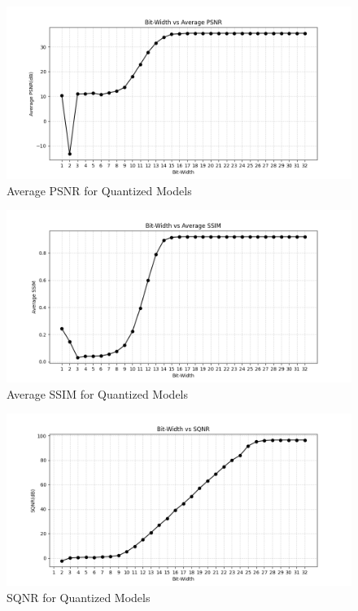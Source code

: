 \documentclass{ioereport}
\begin{document}
    \begin{figure}[H]
        \centering
        \includegraphics[height=0.4\textwidth]{assets/quantization/psnr.png}
        \caption{Average PSNR for Quantized Models}
        \label{fig:psnr-plot}
    \end{figure}

    \begin{figure}[H]
        \centering
        \includegraphics[height=0.4\textwidth]{assets/quantization/ssim.png}
        \caption{Average SSIM for Quantized Models}
        \label{fig:ssim-plot}
    \end{figure}

    \begin{figure}[H]
        \centering
        \includegraphics[height=0.4\textwidth]{assets/quantization/sqnr.png}
        \caption{SQNR for Quantized Models}
        \label{fig:sqnr-plot}
    \end{figure}
\end{document}
